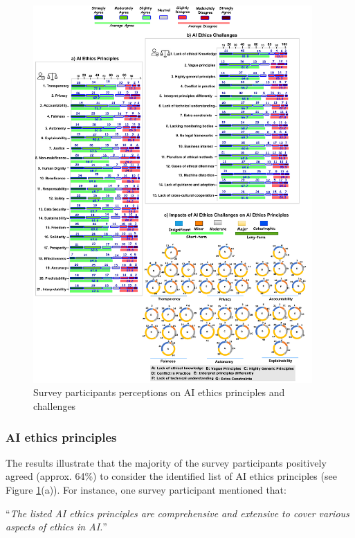 \begin{figure}
\centering
\includegraphics[width=0.95\textwidth]{Figures/SurveyFindings.pdf}
 	\caption{Survey participants perceptions on AI ethics principles and challenges}
	\label{Fig:SurveyFindings}
\end{figure}

\subsubsection{AI ethics principles}
The results illustrate that the majority of the survey participants positively agreed (approx. 64\%) to consider the identified list of AI ethics principles (see Figure \ref{Fig:SurveyFindings}(a)). For instance, one survey participant mentioned that: 

\faComment{} “\textit{The listed AI ethics principles are comprehensive and extensive to cover various aspects of ethics in AI.}” 


